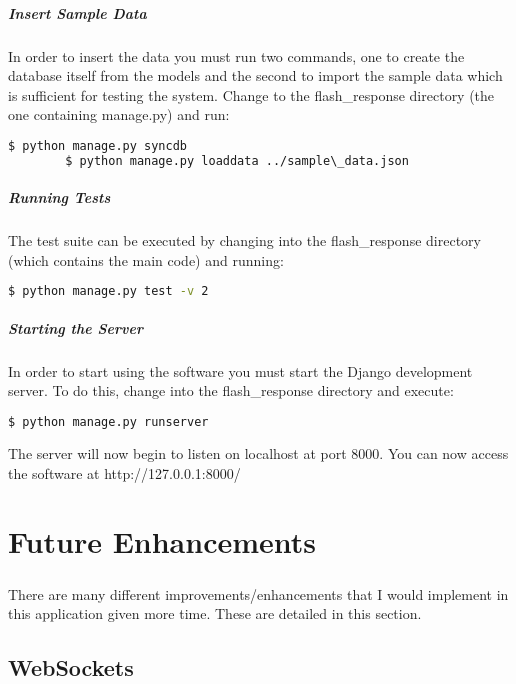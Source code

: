 \documentclass[10pt]{report}
\begin{document}
    \paragraph{Insert Sample Data}
    In order to insert the data you must run two commands, one to create the database itself from the
    models and the second to import the sample data which is sufficient for testing the system. Change to
    the flash\_response directory (the one containing manage.py) and run:
    \begin{lstlisting}[language=bash]
    	$ python manage.py syncdb
    	$ python manage.py loaddata ../sample\_data.json
    \end{lstlisting}
    
    \paragraph{Running Tests}
    The test suite can be executed by changing into the flash\_response directory (which contains the main
    code) and running:
    \begin{lstlisting}[language=bash]
    	$ python manage.py test -v 2
    \end{lstlisting}
    
    \paragraph{Starting the Server}
    In order to start using the software you must start the Django development server.  To do this, change
    into the flash\_response directory and execute:
    \begin{lstlisting}[language=bash]
    	$ python manage.py runserver
    \end{lstlisting}
    The server will now begin to listen on localhost at port 8000.  You can now access the software at 
    http://127.0.0.1:8000/
    
    \chapter*{Future Enhancements}
    \paragraph{}
    There are many different improvements/enhancements that I would implement in this application given
    more time.  These are detailed in this section.
    
    \section*{WebSockets}
\end{document}
